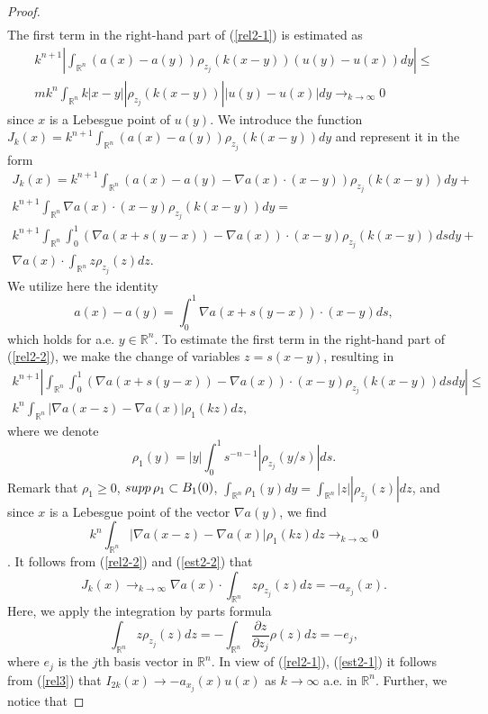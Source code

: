 \documentclass[10pt,a4paper]{amsart}
\newcommand{\R}{{\mathbb R}}
\newcommand{\supp}{\mathop{\rm supp}}
\begin{document}
\begin{proof}
\begin{align}
\end{align}
The first term in the right-hand part of (\ref{rel2-1}) is estimated as
\begin{align}\label{est2-1}
k^{n+1}\left|\int_{\R^n}(a(x)-a(y))\rho_{z_j}(k(x-y))(u(y)-u(x))dy\right|\le \nonumber\\
mk^n\int_{\R^n}k|x-y||\rho_{z_j}(k(x-y))||u(y)-u(x)|dy\mathop{\to}_{k\to\infty} 0
\end{align}
since $x$ is a Lebesgue point of $u(y)$. We introduce the function ${\displaystyle J_k(x)=k^{n+1}\int_{\R^n}(a(x)-a(y))\rho_{z_j}(k(x-y))dy}$ and represent it in the form
\begin{align}\label{rel2-2}
J_k(x)=k^{n+1}\int_{\R^n}(a(x)-a(y)-\nabla a(x)\cdot(x-y))\rho_{z_j}(k(x-y))dy+\nonumber\\ k^{n+1}\int_{\R^n}\nabla a(x)\cdot (x-y)\rho_{z_j}(k(x-y))dy=\nonumber\\
k^{n+1}\int_{\R^n}\int_0^1 (\nabla a(x+s(y-x))-\nabla a(x))\cdot(x-y)\rho_{z_j}(k(x-y))dsdy+\nonumber\\ \nabla a(x)\cdot\int_{\R^n}z\rho_{z_j}(z)dz.
\end{align}
We utilize here the identity
\[
a(x)-a(y)=\int_0^1\nabla a(x+s(y-x))\cdot(x-y)ds,
\]
which holds for a.e. $y\in\R^n$.
To estimate the first term in the right-hand part of (\ref{rel2-2}), we make the change of variables $z=s(x-y)$, resulting in
\begin{align}\label{est2-2}
k^{n+1}\left|\int_{\R^n}\int_0^1 (\nabla a(x+s(y-x))-\nabla a(x))\cdot(x-y)\rho_{z_j}(k(x-y))dsdy\right|\le\nonumber\\
k^n\int_{\R^n} |\nabla a(x-z)-\nabla a(x)|\rho_1(kz)dz,
\end{align}
where we denote
\[
\rho_1(y)=|y|\int_0^1s^{-n-1}|\rho_{z_j}(y/s)|ds.
\]
Remark that $\rho_1\ge 0$, $\supp\rho_1\subset B_1(0)$, $\displaystyle\int_{\R^n}\rho_1(y)dy=\int_{\R^n}|z||\rho_{z_j}(z)|dz$, and since $x$ is a Lebesgue point of the vector $\nabla a(y)$, we find
\[k^n\int_{\R^n} |\nabla a(x-z)-\nabla a(x)|\rho_1(kz)dz\mathop{\to}_{k\to\infty} 0\].
It follows from (\ref{rel2-2}) and (\ref{est2-2}) that
\begin{equation} \label{rel3}
J_k(x)\mathop{\to}_{k\to\infty} \nabla a(x)\cdot\int_{\R^n}z\rho_{z_j}(z)dz=-a_{x_j}(x).
\end{equation}
Here, we apply the integration by parts formula
\[\int_{\R^n}z\rho_{z_j}(z)dz=-\int_{\R^n}\frac{\partial z}{\partial z_j}\rho(z)dz=-e_j, \]
where $e_j$ is the $j$th basis vector in $\R^n$.
In view of (\ref{rel2-1}), (\ref{est2-1}) it follows from (\ref{rel3}) that $I_{2k}(x)\to -a_{x_j}(x)u(x)$ as $k\to\infty$ a.e. in $\R^n$. Further, we notice that

\end{proof}
\end{document}
